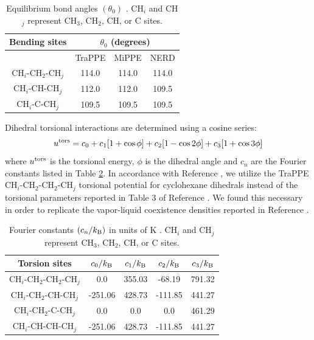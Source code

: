 \documentclass[journal=jced,manuscript=article]{achemso}
\begin{document}
    \begin{table}[h!]
		\caption{Equilibrium bond angles $(\theta_0)$ \cite{Martin1999}. CH$_i$ and CH$_j$ represent CH$_3$, CH$_2$, CH, or C sites.} \label{tab:angles}
		\begin{center}
			\begin{tabular}{|c|c|c|c|}
				\hline
				Bending sites & \multicolumn{3}{|c|}{$\theta_0$ (degrees)} \\ \hline
				& TraPPE & MiPPE & NERD \\ \hline
				CH$_i$-CH$_2$-CH$_j$ & 114.0 & 114.0 & 114.0 \\ 
				CH$_i$-CH-CH$_j$ & 112.0 & 112.0 & 109.5 \\
				CH$_i$-C-CH$_j$ & 109.5 & 109.5 & 109.5 \\
				\hline
			\end{tabular}
		\end{center} 
	\end{table}
    
    Dihedral torsional interactions are determined using a cosine series:
    \begin{equation}
    u^{\rm tors} = c_0 + c_1 [1+\cos{\phi}] + c_2 [1-\cos{2\phi}] + c_3 [1+\cos{3\phi}]
    \end{equation}
    where $u^{\rm tors}$ is the torsional energy, $\phi$ is the dihedral angle and $c_n$ are the Fourier constants listed in Table \ref{tab:torsions}. In accordance with Reference , we utilize the TraPPE CH$_i$-CH$_2$-CH$_2$-CH$_j$ torsional potential for cyclohexane dihedrals instead of the torsional parameters reported in Table 3 of Reference . We found this necessary in order to replicate the vapor-liquid coexistence densities reported in Reference . %
    
    \begin{table}[h!]
    	\caption{Fourier constants $(c_n/k_{\rm B})$ in units of K \cite{Martin1999}. CH$_i$ and CH$_j$ represent CH$_3$, CH$_2$, CH, or C sites.} \label{tab:torsions}
    	\begin{center}
    		\begin{tabular}{|c|c|c|c|c|}
    			\hline
    			Torsion sites & $c_0/k_{\rm B}$ & $c_1/k_{\rm B}$ & $c_2/k_{\rm B}$ & $c_3/k_{\rm B}$ \\ \hline
    			CH$_i$-CH$_2$-CH$_2$-CH$_j$ & 0.0 & 355.03 & -68.19 & 791.32 \\ 
    			CH$_i$-CH$_2$-CH-CH$_j$ & -251.06 & 428.73 & -111.85 & 441.27 \\
    			CH$_i$-CH$_2$-C-CH$_j$ & 0.0 & 0.0 & 0.0 & 461.29 \\
    			CH$_i$-CH-CH-CH$_j$ & -251.06 & 428.73 & -111.85 & 441.27 \\
    			\hline
    		\end{tabular}
    	\end{center} 
    \end{table}
    
\end{document}
